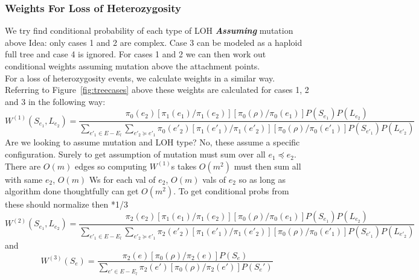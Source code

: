 \documentclass[../../main.tex]{subfiles}
\begin{document}
\subsubsection*{Weights For Loss of Heterozygosity}
We try find conditional probability of each type of LOH \textbf{\textit{Assuming}} mutation above
Idea: only cases 1 and 2 are complex. Case 3 can be modeled as a haploid full tree and case 4 is ignored. For cases 1 and 2 we can then work out conditional weights assuming mutation above the attachment points.\\[1em]
For a loss of heterozygosity events, we calculate weights in a similar way. Referring to Figure~\ref{fig:treecases} above these weights are calculated for cases 1, 2 and 3 in the following way:
\begin{equation*}
W^{(1)}(S_{e_1},L_{e_2}) = \frac{\pi_0(e_2)\left[\pi_1(e_1)/\pi_1(e_2)\right]\left[\pi_0(\rho)/\pi_0(e_1)\right]P(S_{e_1})P(L_{e_2})}{\sum_{e'_1\in E-E_l}\sum_{e'_2\succeq e'_1}\pi_0(e'_2)\left[\pi_1(e'_1)/\pi_1(e'_2)\right]\left[\pi_0(\rho)/\pi_0(e'_1)\right]P(S_{e'_1})P(L_{e'_2})}
\end{equation*}
Are we looking to assume mutation and LOH type? No, these assume a specific configuration. Surely to get assumption of mutation must sum over all $e_1\preceq e_2$. There are $O(m)$ edges so computing $W^{(1)}$s takes $O(m^2)$ must then sum all with same $e_2$, $O(m)$ Ws for each val of $e_2$, $O(m)$ vals of $e_2$ so as long as algorithm done thoughtfully can get $O(m^2)$. To get conditional probs from these should normalize then *1/3
\begin{equation*}
W^{(2)}(S_{e_1},L_{e_2}) = \frac{\pi_2(e_2)\left[\pi_1(e_1)/\pi_1(e_2)\right]\left[\pi_0(\rho)/\pi_0(e_1)\right]P(S_{e_1})P(L_{e_2})}{\sum_{e'_1\in E-E_l}\sum_{e'_2\succeq e'_1}\pi_2(e'_2)\left[\pi_1(e'_1)/\pi_1(e'_2)\right]\left[\pi_0(\rho)/\pi_0(e'_1)\right]P(S_{e'_1})P(L_{e'_2})}
\end{equation*}
and
\begin{equation*}
W^{(3)}(S_e) = \frac{\pi_2(e)\left[\pi_0(\rho)/\pi_2(e)\right]P(S_e)}{\sum_{e'\in E-E_l}\pi_2(e')\left[\pi_0(\rho)/\pi_2(e')\right]P(S_e')}
\end{equation*}
\end{document}
